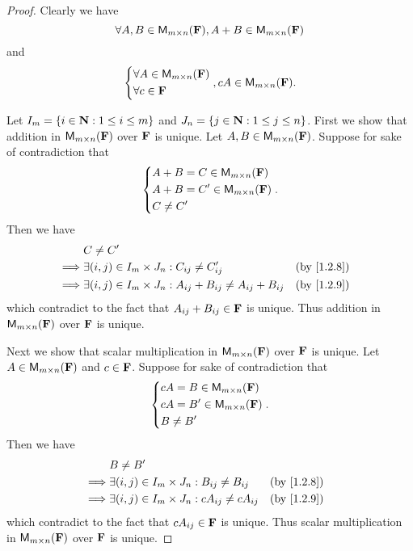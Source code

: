\begin{proof}
    Clearly we have
    \[
        \forall A, B \in {\mathsf{M}_{{m} \times n}({\mathbf{F}})}, A + B \in {\mathsf{M}_{{m} \times n}({\mathbf{F}})}
    \]
    and
    \[
        \begin{dcases}
            \forall A \in {\mathsf{M}_{{m} \times n}({\mathbf{F}})} \\
            \forall c \in \mathbf{F}
        \end{dcases}, cA \in {\mathsf{M}_{{m} \times n}({\mathbf{F}})}.
    \]

    Let \(I_{m} = \left\lbrace i \in \mathbf{N} : 1 \leq i \leq m\right\rbrace\) and \(J_{n} = \left\lbrace j \in \mathbf{N} : 1 \leq j \leq n\right\rbrace\).
    First we show that addition in \({\mathsf{M}_{{m} \times n}({\mathbf{F}})}\) over \(\mathbf{F}\) is unique.
    Let \(A, B \in {\mathsf{M}_{{m} \times n}({\mathbf{F}})}\).
    Suppose for sake of contradiction that
    \[
        \begin{dcases}
            A + B = C \in {\mathsf{M}_{{m} \times n}({\mathbf{F}})}  \\
            A + B = C' \in {\mathsf{M}_{{m} \times n}({\mathbf{F}})} \\
            C \neq C'
        \end{dcases}.
    \]
    Then we have
    \begin{align*}
                 & C \neq C'                                                                                                         \\
        \implies & \exists \p{i, j} \in I_{m} \times J_{n} :  C_{i j} \neq C_{i j}'                    &  & \text{(by \cref{1.2.8})} \\
        \implies & \exists \p{i, j} \in I_{m} \times J_{n} :  A_{i j} + B_{i j} \neq A_{i j} + B_{i j} &  & \text{(by \cref{1.2.9})}
    \end{align*}
    which contradict to the fact that \(A_{i j} + B_{i j} \in \mathbf{F}\) is unique.
    Thus addition in \({\mathsf{M}_{{m} \times n}({\mathbf{F}})}\) over \(\mathbf{F}\) is unique.

    Next we show that scalar multiplication in \({\mathsf{M}_{{m} \times n}({\mathbf{F}})}\) over \(\mathbf{F}\) is unique.
    Let \(A \in {\mathsf{M}_{{m} \times n}({\mathbf{F}})}\) and \(c \in \mathbf{F}\).
    Suppose for sake of contradiction that
    \[
        \begin{dcases}
            cA = B \in {\mathsf{M}_{{m} \times n}({\mathbf{F}})}  \\
            cA = B' \in {\mathsf{M}_{{m} \times n}({\mathbf{F}})} \\
            B \neq B'
        \end{dcases}.
    \]
    Then we have
    \begin{align*}
                 & B \neq B'                                                                                        \\
        \implies & \exists \p{i, j} \in I_{m} \times J_{n} : B_{i j} \neq B_{i j}     &  & \text{(by \cref{1.2.8})} \\
        \implies & \exists \p{i, j} \in I_{m} \times J_{n} : c A_{i j} \neq c A_{i j} &  & \text{(by \cref{1.2.9})}
    \end{align*}
    which contradict to the fact that \(c A_{i j} \in \mathbf{F}\) is unique.
    Thus scalar multiplication in \({\mathsf{M}_{{m} \times n}({\mathbf{F}})}\) over \(\mathbf{F}\) is unique.


\end{proof}
